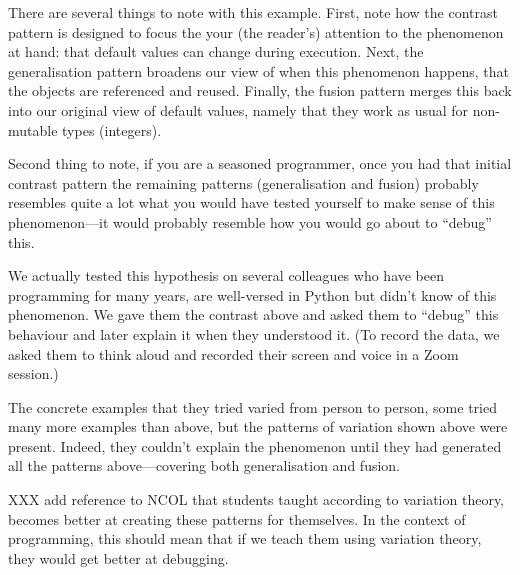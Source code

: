 There are several things to note with this example.
First, note how the contrast pattern is designed to focus the your (the 
reader's) attention to the phenomenon at hand: that default values can change 
during execution.
Next, the generalisation pattern broadens our view of when this phenomenon 
happens, that the objects are referenced and reused.
Finally, the fusion pattern merges this back into our original view of default 
values, namely that they work as usual for non-mutable types (\eg integers).

Second thing to note, if you are a seasoned programmer, once you had that 
initial contrast pattern the remaining patterns (generalisation and fusion) 
probably resembles quite a lot what you would have tested yourself to make 
sense of this phenomenon---it would probably resemble how you would go about to 
\enquote{debug} this.

We actually tested this hypothesis on several colleagues who have been 
programming for many years, are well-versed in Python but didn't know of this 
phenomenon.
We gave them the contrast above and asked them to \enquote{debug} this 
behaviour and later explain it when they understood it.
(To record the data, we asked them to think aloud and recorded their screen and 
voice in a Zoom session.)

The concrete examples that they tried varied from person to person, some tried 
many more examples than above, but the patterns of variation shown above were 
present.
Indeed, they couldn't explain the phenomenon until they had generated all the 
patterns above---covering both generalisation and fusion.

XXX add reference to NCOL that students taught according to variation theory, 
becomes better at creating these patterns for themselves.
In the context of programming, this should mean that if we teach them using 
variation theory, they would get better at debugging.

